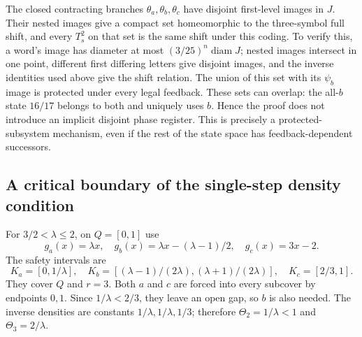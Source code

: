 \documentclass[11pt,reqno]{amsart}
\numberwithin{equation}{section}
\theoremstyle{definition}
\begin{document}
The closed contracting branches $\theta_a,\theta_b,\theta_c$
have disjoint first-level images in $J$. Their nested images give
a compact set homeomorphic to the three-symbol full shift, and
every $T_s^2$ on that set is the same shift under this coding.
To verify this, a word's image has diameter at most
$(3/25)^n\operatorname{diam}J$; nested images intersect in one
point, different first differing letters give disjoint images, and
the inverse identities used above give the shift relation.
The union of this set with its $\psi_b$ image is protected under
every legal feedback. These sets can overlap: the all-$b$ state
$16/17$ belongs to both and uniquely uses $b$. Hence the proof
does not introduce an implicit disjoint phase register. This is
precisely a protected-subsystem mechanism, even if the rest of the
state space has feedback-dependent successors.

\subsection{A critical boundary of the single-step density condition}
For $3/2<\lambda\le2$, on $Q=[0,1]$ use
\[
 g_a(x)=\lambda x,\quad
 g_b(x)=\lambda x-(\lambda-1)/2,\quad
 g_c(x)=3x-2.
\]
The safety intervals are
\[
 K_a=[0,1/\lambda],\quad
 K_b=[(\lambda-1)/(2\lambda),(\lambda+1)/(2\lambda)],
 \quad K_c=[2/3,1].
\]
They cover $Q$ and $r=3$. Both $a$ and $c$ are forced into
every subcover by endpoints $0,1$. Since $1/\lambda<2/3$,
they leave an open gap, so $b$ is also needed. The inverse
densities are constants $1/\lambda,1/\lambda,1/3$; therefore
$\Theta_2=1/\lambda<1$ and $\Theta_3=2/\lambda$.
\end{document}
